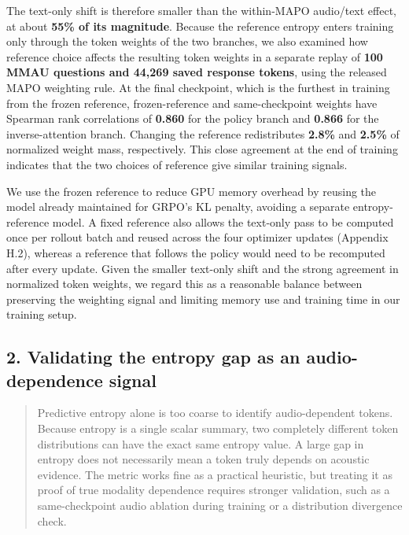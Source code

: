 The text-only shift is therefore smaller than the within-MAPO audio/text effect, at about \textbf{55\% of its magnitude}. Because the reference entropy enters training only through the token weights of the two branches, we also examined how reference choice affects the resulting token weights in a separate replay of \textbf{100 MMAU questions and 44,269 saved response tokens}, using the released MAPO weighting rule. At the final checkpoint, which is the furthest in training from the frozen reference, frozen-reference and same-checkpoint weights have Spearman rank correlations of \textbf{0.860} for the policy branch and \textbf{0.866} for the inverse-attention branch. Changing the reference redistributes \textbf{2.8\%} and \textbf{2.5\%} of normalized weight mass, respectively. This close agreement at the end of training indicates that the two choices of reference give similar training signals.

We use the frozen reference to reduce GPU memory overhead by reusing the model already maintained for GRPO's KL penalty, avoiding a separate entropy-reference model. A fixed reference also allows the text-only pass to be computed once per rollout batch and reused across the four optimizer updates (Appendix H.2), whereas a reference that follows the policy would need to be recomputed after every update. Given the smaller text-only shift and the strong agreement in normalized token weights, we regard this as a reasonable balance between preserving the weighting signal and limiting memory use and training time in our training setup.

\subsection*{2. Validating the entropy gap as an audio-dependence signal}

\begin{quote}\small\color{ReviewQuote}
Predictive entropy alone is too coarse to identify audio-dependent tokens. Because entropy is a single scalar summary, two completely different token distributions can have the exact same entropy value. A large gap in entropy does not necessarily mean a token truly depends on acoustic evidence. The metric works fine as a practical heuristic, but treating it as proof of true modality dependence requires stronger validation, such as a same-checkpoint audio ablation during training or a distribution divergence check.

\end{quote}

